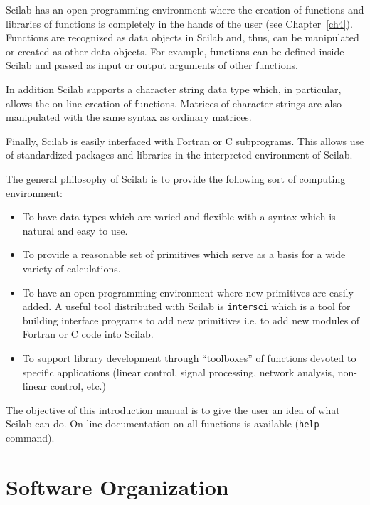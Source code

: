         Scilab has an open programming environment where the
creation of functions and libraries of functions is completely in the
hands of the user (see Chapter~\ref{ch4}).    
Functions are recognized as data objects in Scilab and, thus, can be 
manipulated or created as other data objects.  For example, functions
can be defined inside Scilab and passed as input or output 
arguments of other functions.

In addition Scilab supports a character string data type 
which, in particular, allows the on-line creation of functions.
Matrices of character strings are also manipulated with the same
syntax as ordinary matrices.

        Finally, Scilab is easily interfaced with Fortran or C 
subprograms.  This allows use of standardized 
packages and libraries in the interpreted environment of Scilab.

        The general philosophy of Scilab is to provide the following
sort of computing environment:
\begin{itemize}
   \item To have data types which are varied and flexible with 
a syntax which is natural and easy to use.
   \item To provide a reasonable set of primitives which serve
           as a basis for a wide variety of calculations.
   \item To have an open programming environment where new
           primitives are easily added. A useful tool distributed with
 Scilab is {\tt intersci} which
is a tool for building interface programs to add new primitives 
i.e. to add new modules of Fortran or C code into Scilab.

   \item To support library development through ``toolboxes'' of
         functions devoted to specific
           applications (linear control, signal processing, 
           network analysis, non-linear control, etc.)
\end{itemize}

        The objective of this introduction manual is to give the user 
an idea of what Scilab can do. On line documentation on all
functions is available ({\tt help} command).


\section{Software Organization}

